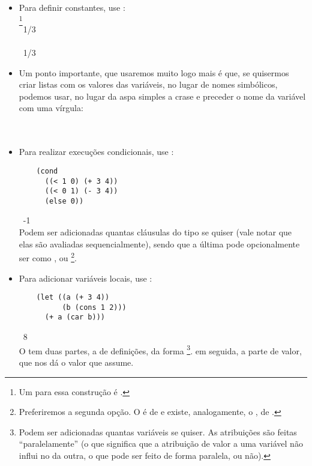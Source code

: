 \documentclass{article}
\begin{document}
\begin{itemize}
\item Para definir constantes, use :\\
  \footnote{Um
     para essa construção é
    .}\\
   \seta\ 1/3\\
  \\
   \seta\ 1/3

\item  Um ponto importante, que usaremos muito logo mais é que, se
  quisermos criar listas com os valores das variáveis, no lugar de
  nomes simbólicos, podemos usar, no lugar da aspa simples a crase e
  preceder o nome da variável com uma vírgula:\\
  \\
   \seta\ 

\item Para realizar execuções condicionais, use :\\
  \begin{lstlisting}
    (cond
      ((< 1 0) (+ 3 4))
      ((< 0 1) (- 3 4))
      (else 0))
  \end{lstlisting}
  \hspace{1cm} \seta\ -1\\
  
  Podem ser adicionadas quantas cláusulas do tipo
   se quiser (vale notar que elas são
  avaliadas sequencialmente), sendo que a última pode
  opcionalmente ser como , ou \footnote{Preferiremos a segunda opção. O
     é de  e existe, analogamente, o
    , de .}.

\item Para adicionar variáveis locais, use :
  \begin{lstlisting}
    (let ((a (+ 3 4))
          (b (cons 1 2)))
      (+ a (car b)))
  \end{lstlisting}
  \hspace{1cm} \seta\ 8\\
  O  tem duas partes, a de definições, da forma
  \footnote{Podem ser adicionadas quantas variáveis se
    quiser. As atribuições são feitas ``paralelamente'' (o que
    significa que a atribuição de valor a uma variável não influi no
    da outra, o que pode ser feito de forma paralela, ou não).}.
  em seguida, a parte de valor, que nos dá o valor que 
  assume.  
\end{itemize}
\end{document}
